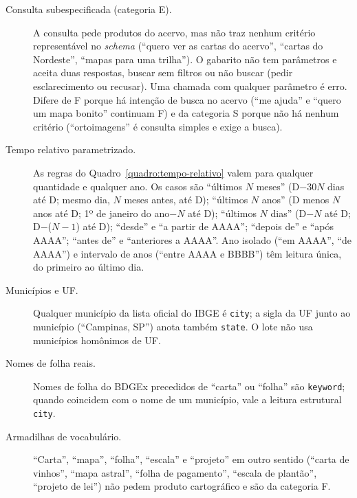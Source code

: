 \begin{description}
  \item[Consulta subespecificada (categoria E).] A consulta pede produtos do acervo, mas não traz nenhum critério representável no \textit{schema} (``quero ver as cartas do acervo'', ``cartas do Nordeste'', ``mapas para uma trilha''). O gabarito não tem parâmetros e aceita duas respostas, buscar sem filtros ou não buscar (pedir esclarecimento ou recusar). Uma chamada com qualquer parâmetro é erro. Difere de F porque há intenção de busca no acervo (``me ajuda'' e ``quero um mapa bonito'' continuam F) e da categoria S porque não há nenhum critério (``ortoimagens'' é consulta simples e exige a busca).
  \item[Tempo relativo parametrizado.] As regras do Quadro~\ref{quadro:tempo-relativo} valem para qualquer quantidade e qualquer ano. Os casos são ``últimos $N$ meses'' (D$-$30$N$ dias até D; mesmo dia, $N$ meses antes, até D); ``últimos $N$ anos'' (D menos $N$ anos até D; 1º de janeiro do ano$-N$ até D); ``últimos $N$ dias'' (D$-N$ até D; D$-$($N-1$) até D); ``desde'' e ``a partir de AAAA''; ``depois de'' e ``após AAAA''; ``antes de'' e ``anteriores a AAAA''. Ano isolado (``em AAAA'', ``de AAAA'') e intervalo de anos (``entre AAAA e BBBB'') têm leitura única, do primeiro ao último dia.
  \item[Municípios e UF.] Qualquer município da lista oficial do IBGE é \texttt{city}; a sigla da UF junto ao município (``Campinas, SP'') anota também \texttt{state}. O lote não usa municípios homônimos de UF.
  \item[Nomes de folha reais.] Nomes de folha do BDGEx precedidos de ``carta'' ou ``folha'' são \texttt{keyword}; quando coincidem com o nome de um município, vale a leitura estrutural \texttt{city}.
  \item[Armadilhas de vocabulário.] ``Carta'', ``mapa'', ``folha'', ``escala'' e ``projeto'' em outro sentido (``carta de vinhos'', ``mapa astral'', ``folha de pagamento'', ``escala de plantão'', ``projeto de lei'') não pedem produto cartográfico e são da categoria F.
\end{description}
